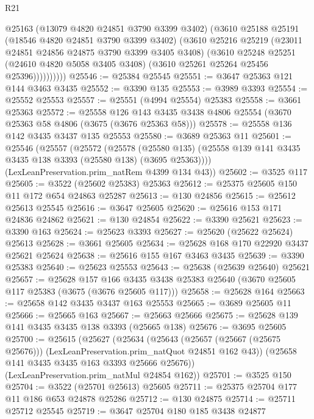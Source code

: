 \begin{lexlean}{R21}
\begin{coremodule}
                @25163
                (@13079 @4820 @24851 @3790 @3399 @3402)
                (@3610
                  @25188
                  @25191
                  (@18546 @4820 @24851 @3790 @3399 @3402)
                  (@3610
                    @25216
                    @25219
                    (@23011 @24851 @24856 @24875 @3790 @3399 @3405 @3408)
                    (@3610
                      @25248
                      @25251
                      (@24610 @4820 @5058 @3405 @3408)
                      (@3610 @25261 @25264 @25456 @25396))))))))))
@25546 := @25384 @25545
@25551 := @3647 @25363 @121 @144 @3463 @3435
@25552 := @3390 @135
@25553 := @3989 @3393
@25554 := @25552 @25553
@25557 := @25551 (@4994 @25554) @25383
@25558 := @3661 @25363
@25572 := @25558
    @126
    @143
    @3435
    @3438
    @4806
    @25554
    (@3670 @25363 @58 @4806 (@3675 (@3676 @25363 @58)))
@25578 := @25558 @136 @142 @3435 @3437 @135 @25553
@25580 := @3689 @25363 @11
@25601 := @25546
    (@25557
      (@25572
        (@25578
          (@25580 @135)
          (@25558 @139 @141 @3435 @3435 @138 @3393 (@25580 @138) (@3695 @25363))))
      (LexLeanPreservation.prim_natRem @4399 @134 @43))
@25602 := @3525 @117
@25605 := @3522 (@25602 @25383) @25363
@25612 := @25375 @25605 @150 @11 @172 @654 @24863 @25287
@25613 := @130 @24856
@25615 := @25612 @25613 @25545
@25616 := @3647 @25605
@25620 := @25616 @153 @171 @24836 @24862
@25621 := @130 @24854
@25622 := @3390 @25621
@25623 := @3390 @163
@25624 := @25623 @3393
@25627 := @25620 (@25622 @25624) @25613
@25628 := @3661 @25605
@25634 := @25628 @168 @170 @22920 @3437 @25621 @25624
@25638 := @25616 @155 @167 @3463 @3435
@25639 := @3390 @25383
@25640 := @25623 @25553
@25643 := @25638 (@25639 @25640) @25621
@25657 := @25628
    @157
    @166
    @3435
    @3438
    @25383
    @25640
    (@3670 @25605 @117 @25383 (@3675 (@3676 @25605 @117)))
@25658 := @25628 @164
@25663 := @25658 @142 @3435 @3437 @163 @25553
@25665 := @3689 @25605 @11
@25666 := @25665 @163
@25667 := @25663 @25666
@25675 := @25628 @139 @141 @3435 @3435 @138 @3393 (@25665 @138)
@25676 := @3695 @25605
@25700 := @25615
    (@25627
      (@25634
        (@25643
          (@25657 (@25667 (@25675 @25676)))
          (LexLeanPreservation.prim_natQuot @24851 @162 @43))
        (@25658 @141 @3435 @3435 @163 @3393 @25666 @25676))
      (LexLeanPreservation.prim_natMul @24854 @162))
@25701 := @3525 @150
@25704 := @3522 (@25701 @25613) @25605
@25711 := @25375 @25704 @177 @11 @186 @653 @24878 @25286
@25712 := @130 @24875
@25714 := @25711 @25712 @25545
@25719 := @3647 @25704 @180 @185 @3438 @24877

\end{coremodule}
\end{lexlean}

